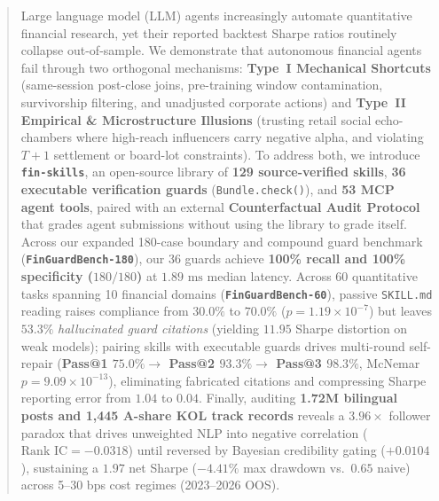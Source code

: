 \begin{abstract}
Large language model (LLM) agents increasingly automate quantitative financial research, yet their reported backtest Sharpe ratios routinely collapse out-of-sample. We demonstrate that autonomous financial agents fail through two orthogonal mechanisms: \textbf{Type~I Mechanical Shortcuts} (same-session post-close joins, pre-training window contamination, survivorship filtering, and unadjusted corporate actions) and \textbf{Type~II Empirical \& Microstructure Illusions} (trusting retail social echo-chambers where high-reach influencers carry negative alpha, and violating $T+1$ settlement or board-lot constraints). To address both, we introduce \textbf{\texttt{fin-skills}}, an open-source library of \textbf{129 source-verified skills}, \textbf{36 executable verification guards} (\texttt{Bundle.check()}), and \textbf{53 MCP agent tools}, paired with an external \textbf{Counterfactual Audit Protocol} that grades agent submissions without using the library to grade itself. Across our expanded 180-case boundary and compound guard benchmark (\textbf{\texttt{FinGuardBench-180}}), our 36 guards achieve \textbf{100\% recall and 100\% specificity ($180/180$)} at $1.89\text{ ms}$ median latency. Across 60 quantitative tasks spanning 10 financial domains (\textbf{\texttt{FinGuardBench-60}}), passive \texttt{SKILL.md} reading raises compliance from $30.0\%$ to $70.0\%$ ($p = 1.19 \times 10^{-7}$) but leaves $53.3\%$ \emph{hallucinated guard citations} (yielding $11.95$ Sharpe distortion on weak models); pairing skills with executable guards drives multi-round self-repair (\textbf{Pass@1 $75.0\% \to$ Pass@2 $93.3\% \to$ Pass@3 $98.3\%$}, McNemar $p = 9.09 \times 10^{-13}$), eliminating fabricated citations and compressing Sharpe reporting error from $1.04$ to $0.04$. Finally, auditing \textbf{1.72M bilingual posts and 1,445 A-share KOL track records} reveals a $3.96\times$ follower paradox that drives unweighted NLP into negative correlation ($\text{Rank IC} = -0.0318$) until reversed by Bayesian credibility gating ($+0.0104$), sustaining a $1.97$ net Sharpe ($-4.41\%$ max drawdown vs.\ $0.65$ naive) across 5--30 bps cost regimes (2023--2026 OOS).
\end{abstract}
